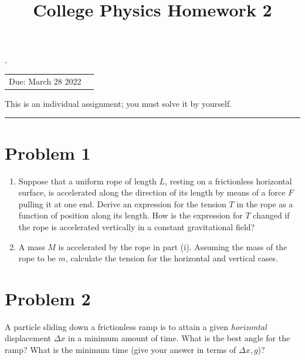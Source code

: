\documentclass[12pt]{article}
\title{College Physics Homework 2 }
\begin{document}
  \maketitle,
  \begin{center}

  \vspace{-0.3in}
  \begin{tabular}{rl}
  Due: March 28 2022 & 
  \end{tabular}
  \end{center}
  This is an individual assignment; you must solve it by yourself.
  \noindent

  \rule{\linewidth}{0.4pt}
\section*{Problem 1}
\begin{enumerate}[label=(\roman*)]
\item Suppose that a uniform rope of length $L$, resting on a frictionless horizontal surface, is accelerated along the direction of its length by means of a force $F$ pulling it at one end. Derive an expression for the tension $T$ in the rope as a function of position along its length. How is the expression for $T$ changed if the rope is accelerated vertically in a constant gravitational field?
\item A mass $M$ is accelerated by the rope in part (i). Assuming the mass of the rope to be $m$, calculate the tension for the horizontal and vertical cases.
\end{enumerate}
\section*{Problem 2}
A particle sliding down a frictionless ramp is to attain a given \textit{horizontal} displacement $\Delta x$ in a minimum amount of time. What is the best angle for the ramp? What is the minimum time (give your answer in terms of $\Delta x, g$)?
\end{document}
